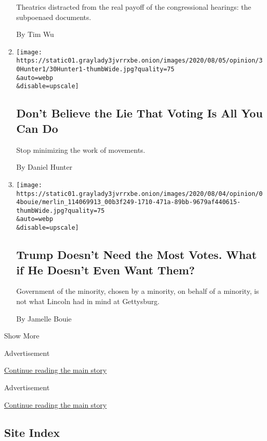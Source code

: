 \begin{enumerate}
  Theatrics distracted from the real payoff of the congressional
  hearings: the subpoenaed documents.

  By Tim Wu
\item
  \href{/2020/08/04/opinion/voting-2020-election-blm-movement.html}{}

  \texttt{[image: https://static01.graylady3jvrrxbe.onion/images/2020/08/05/opinion/30Hunter1/30Hunter1-thumbWide.jpg?quality=75\\\&auto=webp\\\&disable=upscale]}

  \hypertarget{dont-believe-the-lie-that-voting-is-all-you-can-do}{%
  \subsection{Don't Believe the Lie That Voting Is All You Can
  Do}\label{dont-believe-the-lie-that-voting-is-all-you-can-do}}

  Stop minimizing the work of movements.

  By Daniel Hunter
\item
  \href{/2020/08/04/opinion/trump-2020-electoral-college.html}{}

  \texttt{[image: https://static01.graylady3jvrrxbe.onion/images/2020/08/04/opinion/04bouie/merlin\_114069913\_00b3f249-1710-471a-89bb-9679af440615-thumbWide.jpg?quality=75\\\&auto=webp\\\&disable=upscale]}

  \hypertarget{trump-doesnt-need-the-most-votes-what-if-he-doesnt-even-want-them}{%
  \subsection{Trump Doesn't Need the Most Votes. What if He Doesn't Even
  Want
  Them?}\label{trump-doesnt-need-the-most-votes-what-if-he-doesnt-even-want-them}}

  Government of the minority, chosen by a minority, on behalf of a
  minority, is not what Lincoln had in mind at Gettysburg.

  By Jamelle Bouie
\end{enumerate}

Show More

Advertisement

\protect\hyperlink{after-mid1}{Continue reading the main story}

Advertisement

\protect\hyperlink{after-mktg}{Continue reading the main story}

\hypertarget{site-index}{%
\subsection{Site Index}\label{site-index}}

